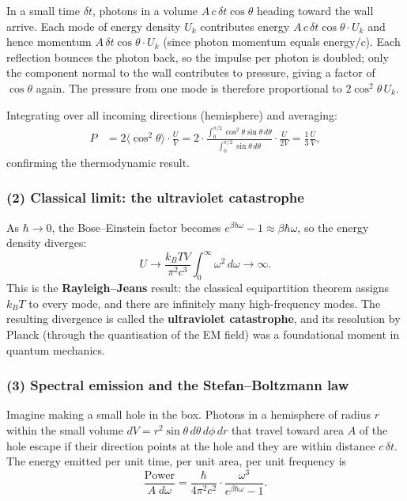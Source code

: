 In a small time $\delta t$, photons in a volume $A\,c\,\delta t\cos\theta$ heading
toward the wall arrive.  Each mode of energy density $U_k$ contributes energy
$A\,c\,\delta t\cos\theta \cdot U_k$ and hence momentum
$A\,\delta t\cos\theta \cdot U_k$ (since photon momentum equals energy$/c$).
Each reflection bounces the photon back, so the impulse per photon is doubled;
only the component normal to the wall contributes to pressure, giving a factor of
$\cos\theta$ again.  The pressure from one mode is therefore proportional to
$2\cos^2\theta\, U_k$.

Integrating over all incoming directions (hemisphere) and averaging:
\begin{align}
    P &= 2\langle\cos^2\theta\rangle\cdot\frac{U}{V}
    = 2\cdot\frac{\int_0^{\pi/2}\cos^2\theta\sin\theta\,d\theta}
                 {\int_0^{\pi/2}\sin\theta\,d\theta}
    \cdot\frac{U}{2V}
    = \frac{1}{3}\frac{U}{V},
\end{align}
confirming the thermodynamic result.

\subsubsection*{(2) Classical limit: the ultraviolet catastrophe}

As $\hbar\to 0$, the Bose--Einstein factor becomes
$e^{\beta\hbar\omega}-1\approx \beta\hbar\omega$, so the energy density
diverges:
\begin{equation}
    U \to \frac{k_BTV}{\pi^2 c^3}\int_0^\infty \omega^2\,d\omega \to \infty.
\end{equation}
This is the \textbf{Rayleigh--Jeans} result: the classical equipartition theorem
assigns $k_BT$ to every mode, and there are infinitely many high-frequency modes.
The resulting divergence is called the \textbf{ultraviolet catastrophe}, and its
resolution by Planck (through the quantisation of the EM field) was a foundational
moment in quantum mechanics.

\subsubsection*{(3) Spectral emission and the Stefan--Boltzmann law}

Imagine making a small hole in the box.  Photons in a hemisphere of radius $r$
within the small volume $dV = r^2\sin\theta\,d\theta\,d\phi\,dr$ that travel
toward area $A$ of the hole escape if their direction points at the hole and they
are within distance $c\,\delta t$.  The energy emitted per unit time, per unit
area, per unit frequency is
\begin{equation}
    \frac{\text{Power}}{A\;d\omega}
    = \frac{\hbar}{4\pi^2 c^2}\cdot\frac{\omega^3}{e^{\beta\hbar\omega}-1}.
\end{equation}

